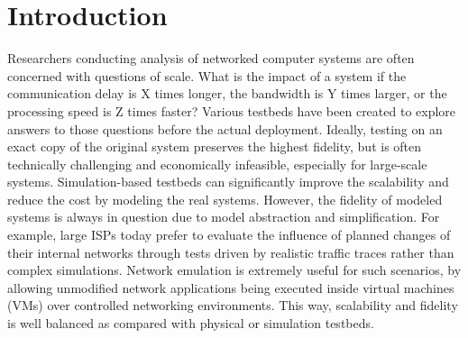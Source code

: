 \section{Introduction}
\label{Sec-Intro}

Researchers conducting analysis of networked computer systems are often concerned with questions of scale. What is the impact of a system if the communication delay is X times longer, the bandwidth is Y times larger, or the processing speed is Z times faster? Various testbeds have been created to explore answers to those questions before the actual deployment. Ideally, testing on an exact copy of the original system preserves the highest fidelity, but is often technically challenging and economically infeasible, especially for large-scale systems. Simulation-based testbeds can significantly improve the scalability and reduce the cost by modeling the real systems. However, the fidelity of modeled systems is always in question due to model abstraction and simplification. For example, large ISPs today prefer to evaluate the influence of planned changes of their internal networks through tests driven by realistic traffic traces rather than complex simulations. Network emulation is extremely useful for such scenarios, by allowing unmodified network applications being executed inside virtual machines (VMs) over controlled networking environments. This way, scalability and fidelity is well balanced as compared with physical or simulation testbeds.

